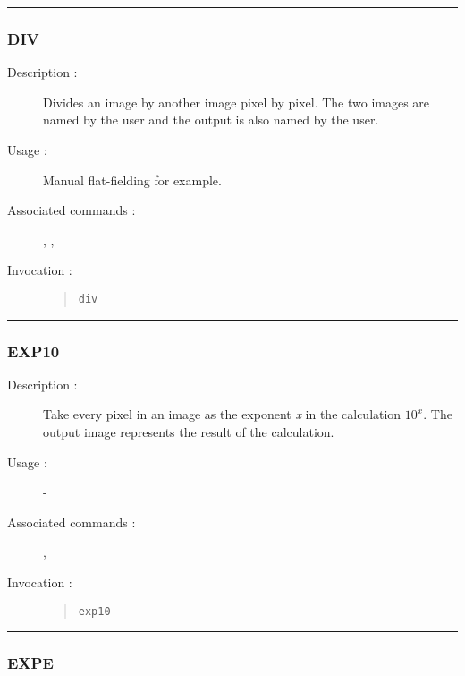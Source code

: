 \hrule 
\subsubsection*{\label{DIV}DIV}

\begin{description}

\item[Description :] Divides an image by another image pixel by pixel.
The two images are named by the user and the output is also named by
the user.

\item[Usage :] Manual flat-fielding for example.

\item[Associated commands :] {\tt {}}, 
{\tt {}}, {\tt {}}

\item[Invocation :]

\begin{quote}{\tt  div }\end{quote}

\end{description}

\hrule 
\subsubsection*{\label{EXP10}EXP10}

\begin{description}

\item[Description :] Take every pixel in an image as the exponent {\it x} in
the calculation $10^{x}$.  The output image represents the result of the
calculation.

\item[Usage :] -

\item[Associated commands :] {\tt {}}, 
{\tt {}}

\item[Invocation :]

\begin{quote}{\tt  exp10 }\end{quote}

\end{description}

\hrule 
\subsubsection*{\label{EXPE}EXPE}

